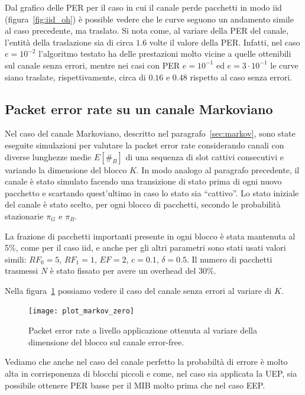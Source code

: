 \documentclass[italian, a4paper, 12pt]{article}
\begin{document}
Dal grafico delle PER per il caso in cui il canale perde pacchetti in
modo iid (figura~\ref{fig:iid_oh}) è possible vedere che le curve
seguono un andamento simile al caso precedente, ma traslato.
Si nota come, al variare della PER del canale, l'entità della traslazione
sia di circa $1.6$ volte il valore della PER.
%
Infatti, nel caso $e = 10^{-2}$ l'algoritmo testato ha delle
prestazioni molto vicine a quelle ottenibili sul canale senza errori,
mentre nei casi con PER $e = 10^{-1}$ ed $e = 3\cdot 10^{-1}$ le curve
siano traslate, rispettivamente, circa di $0.16$ e $0.48$ rispetto al
caso senza errori.

\subsection{Packet error rate su un canale Markoviano}
Nel caso del canale Markoviano, descritto nel
paragrafo~\ref{sec:markov}, sono state eseguite simulazioni per
valutare la packet error rate considerando canali con diverse
lunghezze medie $E[\#_B]$ di una sequenza di slot cattivi consecutivi
e variando la dimensione del blocco $K$.
%
In modo analogo al paragrafo precedente, il canale è stato simulato
facendo una transizione di stato prima di ogni nuovo pacchetto e
scartando quest'ultimo in caso lo stato sia ``cattivo''. Lo stato
iniziale del canale è stato scelto, per ogni blocco di pacchetti, 
secondo le probabilità stazionarie $\pi_G$ e $\pi_B$.

La frazione di pacchetti importanti presente in ogni blocco è stata
mantenuta al 5\%, come per il caso iid, e anche per gli altri
parametri sono stati usati valori simili: $RF_0 = 5$, $RF_1 = 1$,
$EF=2$, $c=0.1$, $\delta=0.5$. Il numero di pacchetti trasmessi $N$ è
stato fissato per avere un overhead del 30\%.

Nella figura~\ref{fig:markov_zero} possiamo vedere il caso del canale
senza errori al variare di $K$.
%
\begin{figure}[htb]
  \centering
  \texttt{[image: plot\_markov\_zero]}
  \caption{Packet error rate a livello applicazione ottenuta al
    variare della dimensione del blocco sul canale error-free.}
  \label{fig:markov_zero}
\end{figure}
%
Vediamo che anche nel caso del canale perfetto la probabiltà di errore
è molto alta in corrisponenza di blocchi piccoli e come, nel caso sia
applicata la UEP, sia possibile ottenere PER basse per il MIB molto
prima che nel caso EEP.
\end{document}
